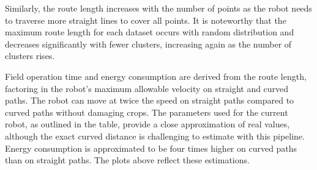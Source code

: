 \vspace{3mm} 

Similarly, the route length increases with the number of points as the robot needs to traverse more straight lines to cover all points. It is noteworthy that the maximum route length for each dataset occurs with random distribution and decreases significantly with fewer clusters, increasing again as the number of clusters rises.

\vspace{3mm} 

Field operation time and energy consumption are derived from the route length, factoring in the robot's maximum allowable velocity on straight and curved paths. The robot can move at twice the speed on straight paths compared to curved paths without damaging crops. The parameters used for the current robot, as outlined in the table, provide a close approximation of real values, although the exact curved distance is challenging to estimate with this pipeline. Energy consumption is approximated to be four times higher on curved paths than on straight paths. The plots above reflect these estimations. 


